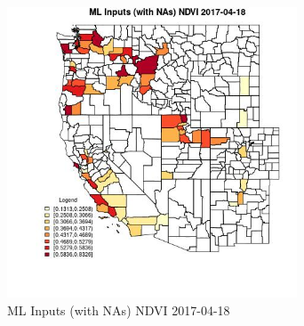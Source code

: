 \begin{figure} 
\centering  
\includegraphics[width=0.77\textwidth]{Code_Outputs/Report_ML_input_PM25_Step4_part_f_de_duplicated_aveswNAs_CountyNDVIMean2017-04-18.jpg} 
\caption{\label{fig:Report_ML_input_PM25_Step4_part_f_de_duplicated_aveswNAsCountyNDVIMean2017-04-18}ML Inputs (with NAs) NDVI 2017-04-18} 
\end{figure} 
 
